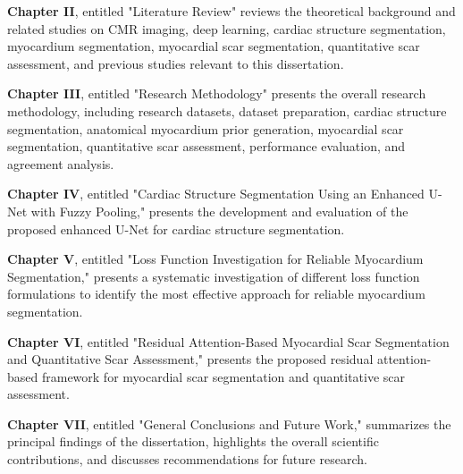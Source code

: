 \textbf{Chapter II}, entitled "Literature Review" reviews the theoretical background and related studies on CMR imaging, deep learning, cardiac structure segmentation, myocardium segmentation, myocardial scar segmentation, quantitative scar assessment, and previous studies relevant to this dissertation.

\textbf{Chapter III}, entitled "Research Methodology" presents the overall research methodology, including research datasets, dataset preparation, cardiac structure segmentation, anatomical myocardium prior generation, myocardial scar segmentation, quantitative scar assessment, performance evaluation, and agreement analysis. 

\textbf{Chapter IV}, entitled "Cardiac Structure Segmentation Using an Enhanced U-Net with Fuzzy Pooling," presents the development and evaluation of the proposed enhanced U-Net for cardiac structure segmentation.

\textbf{Chapter V}, entitled "Loss Function Investigation for Reliable Myocardium Segmentation," presents a systematic investigation of different loss function formulations to identify the most effective approach for reliable myocardium segmentation.

\textbf{Chapter VI}, entitled "Residual Attention-Based Myocardial Scar Segmentation and Quantitative Scar Assessment," presents the proposed residual attention-based framework for myocardial scar segmentation and quantitative scar assessment.

\textbf{Chapter VII}, entitled "General Conclusions and Future Work," summarizes the principal findings of the dissertation, highlights the overall scientific contributions, and discusses recommendations for future research. 
